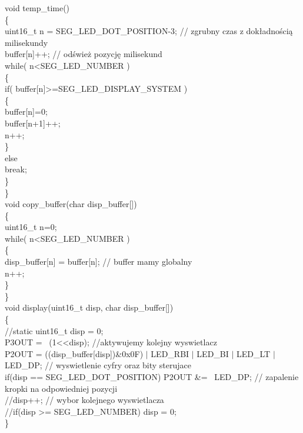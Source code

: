 \documentclass[a4paper,titlepage,11pt,floatssmall]{mwrep}
\begin{document}
\noindent void temp\_{}time()\\
\{\\
    uint16\_{}t n = SEG\_{}LED\_{}DOT\_{}POSITION-3; // zgrubny czas z dokładnością milisekundy\\
    buffer[n]++; // odśwież pozycję milisekund\\
    while( n<SEG\_{}LED\_{}NUMBER )\\
    \{\\
        if( buffer[n]>=SEG\_{}LED\_{}DISPLAY\_{}SYSTEM )\\
        \{\\
            buffer[n]=0;\\
            buffer[n+1]++;\\
            n++;\\
       \}\\
        else\\
            break;\\
    \}\\
\}\\

\noindent void copy\_{}buffer(char disp\_{}buffer[])\\
\{\\
	uint16\_{}t n=0;\\
    while( n<SEG\_{}LED\_{}NUMBER )\\
    \{\\
        disp\_{}buffer[n] = buffer[n]; // buffer mamy globalny\\
        n++;\\
    \}\\
\}\\

\noindent void display(uint16\_{}t disp, char disp\_{}buffer[])\\
\{\\
	//static uint16\_{}t disp = 0;\\
P3OUT = ~(1<<disp); //aktywujemy kolejny wyswietlacz\\
P2OUT = ((disp\_{}buffer[disp])\&0x0F) $\vert$ LED\_{}RBI $\vert$ LED\_{}BI $\vert$ LED\_{}LT $\vert$ LED\_{}DP; // wyswietlenie cyfry oraz bity sterujace\\
if(disp == SEG\_{}LED\_{}DOT\_{}POSITION) P2OUT \&= ~LED\_{}DP; // zapalenie kropki na odpowiedniej pozycji\\
//disp++; // wybor kolejnego wyswietlacza\\
//if(disp >= SEG\_{}LED\_{}NUMBER) disp = 0;\\
\}\\
\end{document}
